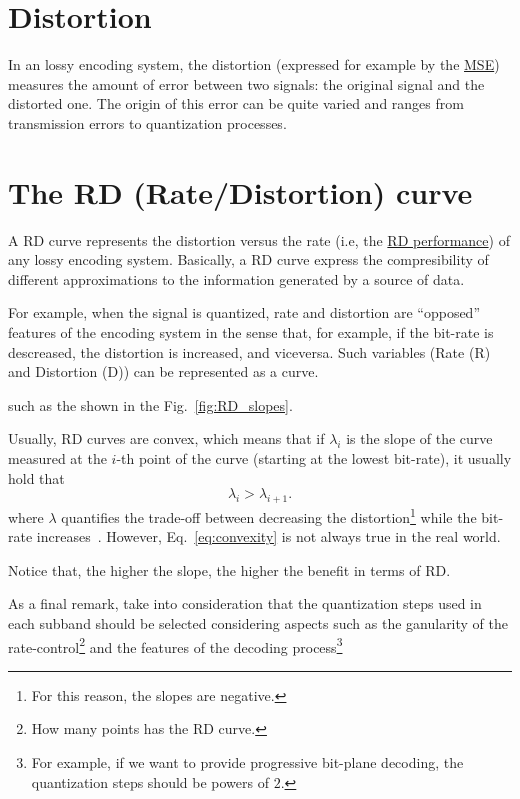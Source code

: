 \section{Distortion}

In an lossy encoding system, the distortion (expressed for example by
the \href{https://en.wikipedia.org/wiki/Mean_squared_error}{MSE})
measures the amount of error between two signals: the original signal
and the distorted one. The origin of this error can be quite varied
and ranges from transmission errors to quantization processes.

\section{The RD (Rate/Distortion) curve}

A RD curve represents the distortion versus the rate (i.e, the
\href{https://en.wikipedia.org/wiki/Rate-distortion_theory}{RD
  performance}) of any lossy encoding system. Basically, a RD curve
express the compresibility of different approximations to the
information generated by a source of data.

For example, when the signal is quantized, rate and distortion are
``opposed'' features of the encoding system in the sense that, for
example, if the bit-rate is descreased, the distortion is increased,
and viceversa. Such variables (Rate (R) and Distortion (D)) can be
represented as a curve.

such as the shown in the
Fig.~\ref{fig:RD_slopes}.


Usually, RD curves are convex, which means
that if $\lambda_i$ is the slope of the curve measured at the $i$-th
point of the curve (starting at the lowest bit-rate), it usually hold
that
\begin{equation}
  \lambda_i > \lambda_{i+1}.
  \label{eq:convexity}
\end{equation}
where $\lambda$ quantifies the trade-off between decreasing the
distortion\footnote{For this reason, the slopes are negative.} while
the bit-rate
increases~\cite{vetterli1995wavelets,sayood2017introduction}. However,
Eq.~\eqref{eq:convexity} is not always true in the real world.

Notice that, the higher the slope, the higher the benefit in terms of RD.

As a final remark, take into consideration that the quantization steps
used in each subband should be selected considering aspects such as
the ganularity of the rate-control\footnote{How many points has the RD
curve.} and the features of the decoding process\footnote{For example,
if we want to provide progressive bit-plane decoding, the quantization
steps should be powers of $2$.}

